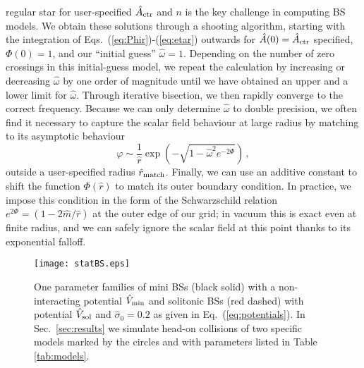 \documentclass[]{iopart}
\begin{document}
regular star for user-specified $\hat{A}_{\rm ctr}$ and $n$ is
the key challenge in computing BS models. We obtain
these solutions through a shooting algorithm, starting with
the integration of
Eqs.~(\ref{eq:Phir})-(\ref{eq:etar}) outwards for
$\hat{A}(0)=\hat{A}_{\rm ctr}$ specified, $\Phi(0)=1$, and our
``initial guess'' $\hat{\omega}=1$. Depending on the number
of zero crossings in this initial-guess model, we repeat
the calculation by increasing or decreasing $\hat{\omega}$
by one order of magnitude until we have obtained an upper and
a lower limit for $\hat{\omega}$. Through iterative bisection,
we then rapidly converge to the correct frequency. Because
we can only determine $\hat{\omega}$ to double precision,
we often find it necessary to capture the scalar field
behaviour at large radius by matching to its asymptotic behaviour
%
\begin{equation}
  \varphi \sim \frac{1}{\hat{r}}
  \exp\left( {-\sqrt{1-\hat{\omega}^2e^{-2\Phi}}}\right)\,,
\end{equation}
%
outside a user-specified radius $\hat{r}_{\rm match}$. Finally,
we can use an additive constant to shift the function $\Phi(\hat{r})$
to match its outer boundary condition. In practice, we impose
this condition in the form of the Schwarzschild relation
$e^{2\Phi}=(1-2\hat{m}/\hat{r})$ at the outer edge of our
grid; in vacuum this is exact even
at finite radius, and we can safely ignore the scalar field
at this point thanks to its exponential falloff.
%
\begin{figure}[b]
    \centering
    \texttt{[image: statBS.eps]}
    \caption{One parameter families of mini BSs (black solid) with a
    non-interacting potential $\hat{V}_{\rm min}$ and solitonic BSs (red dashed) with
    potential $\hat{V}_{\rm sol}$ and $\hat{\sigma}_0=0.2$
    as given in Eq.~(\ref{eq:potentials}). In Sec.~\ref{sec:results}
    we simulate head-on collisions of two specific models
    marked by the circles and with parameters listed in
    Table \ref{tab:models}.
    }
    \label{fig:statBS}
\end{figure}
%
\end{document}
